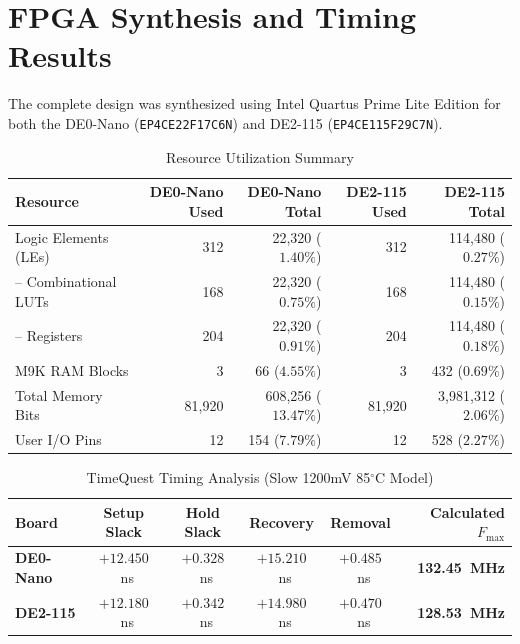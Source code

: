 \documentclass[11pt,a4paper]{article}
\begin{document}
\section{FPGA Synthesis and Timing Results}

The complete design was synthesized using Intel Quartus Prime Lite Edition for both the DE0-Nano (\texttt{EP4CE22F17C6N}) and DE2-115 (\texttt{EP4CE115F29C7N}).

\begin{table}[h!]
\centering
\caption{Resource Utilization Summary}
\label{tab:resource_util}
\small
\begin{tabularx}{\textwidth}{lrrrr}
\toprule
\textbf{Resource} & \textbf{DE0-Nano Used} & \textbf{DE0-Nano Total} & \textbf{DE2-115 Used} & \textbf{DE2-115 Total} \\
\midrule
Logic Elements (LEs) & 312 & 22,320 ($1.40\%$) & 312 & 114,480 ($0.27\%$) \\
-- Combinational LUTs & 168 & 22,320 ($0.75\%$) & 168 & 114,480 ($0.15\%$) \\
-- Registers & 204 & 22,320 ($0.91\%$) & 204 & 114,480 ($0.18\%$) \\
M9K RAM Blocks & 3 & 66 ($4.55\%$) & 3 & 432 ($0.69\%$) \\
Total Memory Bits & 81,920 & 608,256 ($13.47\%$) & 81,920 & 3,981,312 ($2.06\%$) \\
User I/O Pins & 12 & 154 ($7.79\%$) & 12 & 528 ($2.27\%$) \\
\bottomrule
\end{tabularx}
\end{table}

\begin{table}[h!]
\centering
\caption{TimeQuest Timing Analysis (Slow 1200mV 85$^\circ$C Model)}
\label{tab:timing_summary}
\small
\begin{tabularx}{\textwidth}{lccccr}
\toprule
\textbf{Board} & \textbf{Setup Slack} & \textbf{Hold Slack} & \textbf{Recovery} & \textbf{Removal} & \textbf{Calculated $F_{\max}$} \\
\midrule
\textbf{DE0-Nano} & $+12.450$~ns & $+0.328$~ns & $+15.210$~ns & $+0.485$~ns & \textbf{132.45~MHz} \\
\textbf{DE2-115} & $+12.180$~ns & $+0.342$~ns & $+14.980$~ns & $+0.470$~ns & \textbf{128.53~MHz} \\
\bottomrule
\end{tabularx}
\end{table}
\end{document}
